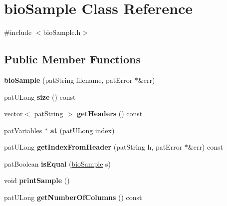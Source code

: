 \hypertarget{classbio_sample}{}\section{bio\+Sample Class Reference}
\label{classbio_sample}


{\ttfamily \#include $<$bio\+Sample.\+h$>$}

\subsection*{Public Member Functions}
\begin{DoxyCompactItemize}
\item 
\mbox{\label{classbio_sample_a8e7a97ab4d5d5f2956ef57737a00c32d}} 
{\bfseries bio\+Sample} (pat\+String filename, pat\+Error $\ast$\&err)
\item 
\mbox{\label{classbio_sample_a8d1afd0ffcfa7bdaeae4bcafc90fe431}} 
pat\+U\+Long {\bfseries size} () const
\item 
\mbox{\label{classbio_sample_a31cfba2652f201351e0e0bf6e95c5d52}} 
vector$<$ pat\+String $>$ {\bfseries get\+Headers} () const
\item 
\mbox{\label{classbio_sample_ad7a0e369be956b9a1aeb26000e273c5a}} 
pat\+Variables $\ast$ {\bfseries at} (pat\+U\+Long index)
\item 
\mbox{\label{classbio_sample_a183bdb50149bc994c56ada21cbc068f6}} 
pat\+U\+Long {\bfseries get\+Index\+From\+Header} (pat\+String h, pat\+Error $\ast$\&err) const
\item 
\mbox{\label{classbio_sample_a5b3c4f90ab274ddf3c705a7e4a2ac62b}} 
pat\+Boolean {\bfseries is\+Equal} (\hyperlink{classbio_sample}{bio\+Sample} s)
\item 
\mbox{\label{classbio_sample_ab2f8b18d4d4348e6a002492e68d86089}} 
void {\bfseries print\+Sample} ()
\item 
\mbox{\label{classbio_sample_a1b324dbfe5a0063a73b4232acc54195c}} 
pat\+U\+Long {\bfseries get\+Number\+Of\+Columns} () const
\item 

\end{DoxyCompactItemize}
